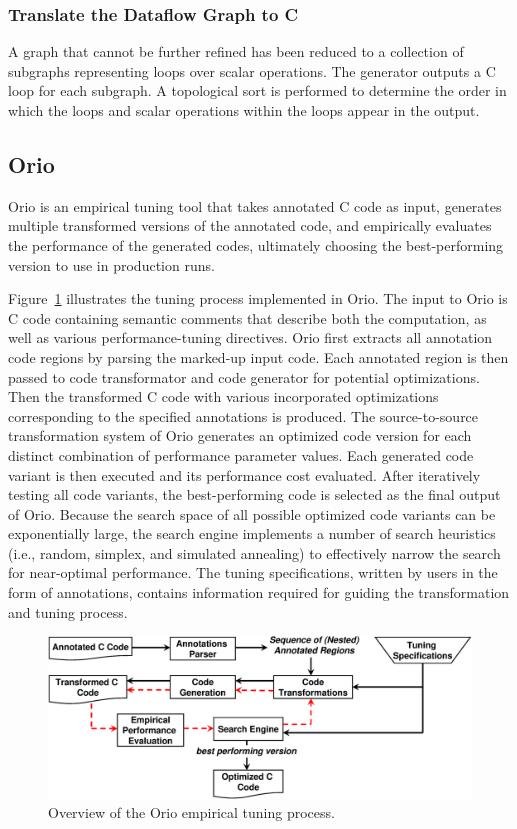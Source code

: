 \documentclass[runningheads]{llncs}
\begin{document}
\subsubsection{Translate the Dataflow Graph to C}

A graph that cannot be further refined has been reduced to a collection of subgraphs representing loops over scalar operations. The generator outputs a C loop for each subgraph.  A topological sort is performed to determine the order in which the loops and scalar operations within the loops appear in the output.
\subsection{Orio}
\label{sec:orio}

Orio is an empirical tuning tool that takes annotated C code as input,
generates multiple transformed versions of the annotated code, and
empirically evaluates the performance of the generated codes,
ultimately choosing the best-performing version to use in production
runs.

Figure~\ref{fig:orio} illustrates the tuning process implemented in
Orio. The input to Orio is C code containing semantic comments that
describe both the computation, as well as various performance-tuning
directives. Orio first extracts all annotation code regions by parsing
the marked-up input code. Each annotated region is then passed to code
transformator and code generator for potential optimizations. Then the
transformed C code with various incorporated optimizations
corresponding to the specified annotations is produced. The
source-to-source transformation system of Orio generates an optimized
code version for each distinct combination of performance parameter
values. Each generated code variant is then executed and its
performance cost evaluated. After iteratively testing all code
variants, the best-performing code is selected as the final output of
Orio. Because the search space of all possible optimized code variants
can be exponentially large, the search engine implements a number of
search heuristics (i.e., random, simplex, and simulated annealing) to
effectively narrow the search for near-optimal performance. The tuning
specifications, written by users in the form of annotations, contains
information required for guiding the transformation and tuning
process.

\begin{figure}[tb]
\vspace{-.1in}
\begin{center}
\includegraphics[width=.65\textwidth]{figures/orio.eps}
\end{center}
\vspace{-.25in}
\caption{Overview of the Orio empirical tuning process.}
\label{fig:orio}
\end{figure}
\end{document}
